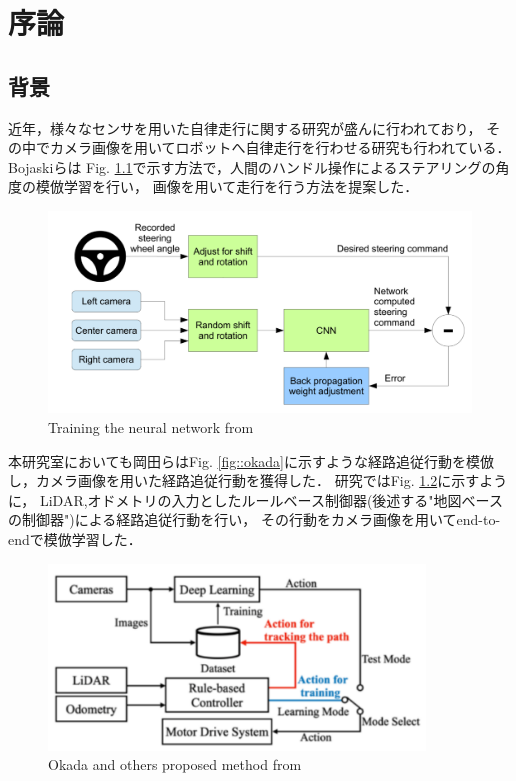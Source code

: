 \chapter{序論}
\section{背景}
近年，様々なセンサを用いた自律走行に関する研究が盛んに行われており，
その中でカメラ画像を用いてロボットへ自律走行を行わせる研究も行われている．
Bojaskiら\cite{Nvidia}は
Fig. \ref{fig::nvidia}で示す方法で，人間のハンドル操作によるステアリングの角度の模倣学習を行い，
画像を用いて走行を行う方法を提案した．

\begin{figure}[h]
    \centering
    \includegraphics[width = 13cm]{./figs/EndtoEnd_Learning_for_Self-Driving_Cars.pdf}
    \caption{Training the neural network from \cite{Nvidia}}
    \label{fig::nvidia}
\end{figure}

\newpage
本研究室においても岡田ら\cite{okada}はFig. \ref{fig::okada}に示すような経路追従行動を模倣し，カメラ画像を用いた経路追従行動を獲得した．
研究ではFig. \ref{fig::okada_sys}に示すように，
LiDAR,オドメトリの入力としたルールベース制御器(後述する"地図べースの制御器")による経路追従行動を行い，
その行動をカメラ画像を用いてend-to-endで模倣学習した．
\begin{figure}[h]
    \centering
    \includegraphics[width = 10cm]{./figs/okada_sys.pdf}
    \caption{Okada and others proposed method from \cite{okada}}
    \label{fig::okada_sys}
\end{figure}

